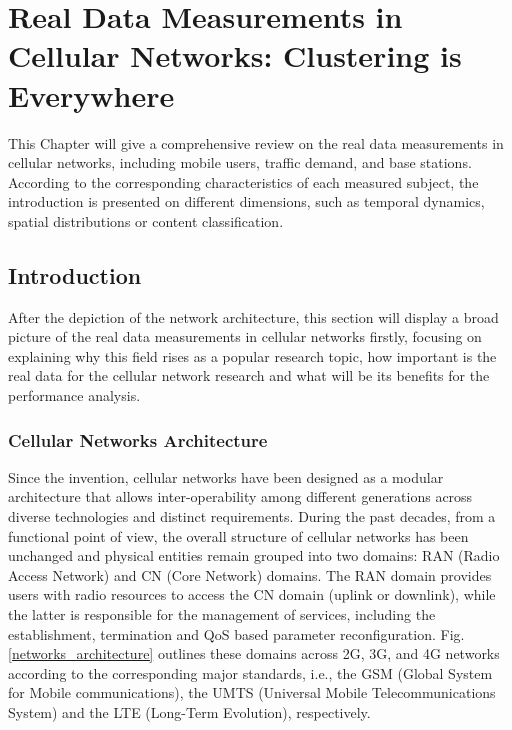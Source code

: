 
\chapter{Real Data Measurements in Cellular Networks: Clustering is Everywhere} %
\minitoc
\label{Chapter2} %


This Chapter will give a comprehensive review on the real data measurements in cellular networks, including mobile users, traffic demand, and base stations. According to the corresponding characteristics of each measured subject, the introduction is presented on different dimensions, such as temporal dynamics, spatial distributions or content classification.

\section{Introduction}
After the depiction of the network architecture, this section will display a broad picture of the real data measurements in cellular networks firstly, focusing on explaining why this field rises as a popular research topic, how important is the real data for the cellular network research and what will be its benefits for the performance analysis.

\subsection{Cellular Networks Architecture}
Since the invention, cellular networks have been designed as a modular architecture that allows inter-operability among different generations across diverse technologies and distinct requirements. During the past decades, from a functional point of view, the overall structure of cellular networks has been unchanged and physical entities remain grouped into two domains: RAN (Radio Access Network) and CN (Core Network) domains. The RAN domain provides users with radio resources to access the CN domain (uplink or downlink), while the latter is responsible for the management of services, including the establishment, termination and QoS based parameter reconfiguration. Fig. \ref{networks_architecture} outlines these domains across 2G, 3G, and 4G networks according to the corresponding major standards, i.e., the GSM (Global System for Mobile communications), the  UMTS (Universal Mobile Telecommunications System) and the LTE (Long-Term Evolution), respectively.

